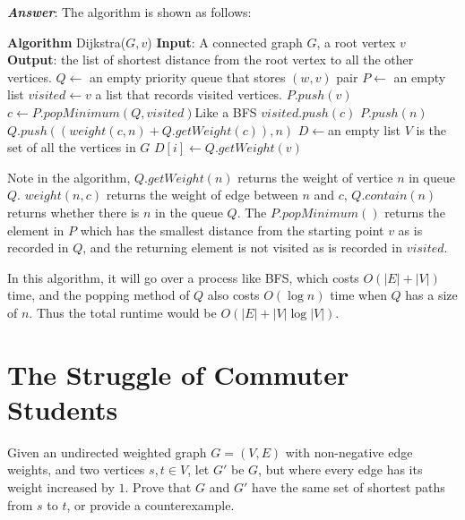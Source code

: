 \documentclass[11pt]{article}
\begin{document}
\noindent \textbf{\emph{Answer}}: The algorithm is shown as follows:
\begin{algorithmic}
	\State \textbf{Algorithm} Dijkstra($G,v$)
	\State \textbf{Input}: A connected graph $G$, a root vertex $v$
	\State \textbf{Output}: the list of shortest distance from the root vertex to all the other vertices.
	\State $Q\gets$ an empty priority queue that stores $(w,v)$ pair
	\State $P\gets$ an empty list
	\State $visited \gets v$ \Comment a list that records visited vertices.
	\State $P.push(v)$
		\State $c\gets P.popMinimum(Q,visited)$\Comment Like a BFS
		\State $visited.push(c)$
			\State $P.push(n)$
				\State $Q.push((weight(c,n)+Q.getWeight(c)),n)$
			\EndIf
		\EndFor
	\EndWhile
	\State $D\gets $an empty list
	\Comment $V$ is the set of all the vertices in $G$
		\State $D[i]\gets Q.getWeight(v)$
	\EndFor
\end{algorithmic}

Note in the algorithm, $Q.getWeight(n)$ returns the weight of vertice $n$ in queue $Q$. $weight(n,c)$ returns the weight of edge between $n$ and $c$, $Q.contain(n)$ returns whether there is $n$ in the queue $Q$. The $P.popMinimum()$ returns the element in $P$ which has the smallest distance from the starting point $v$ as is recorded in $Q$, and the returning element is not visited as is recorded in $visited$.

In this algorithm, it will go over a process like BFS, which costs $O(|E|+|V|)$ time, and the popping method of $Q$ also costs $O(\log n)$ time when $Q$ has a size of $n$. Thus the total runtime would be $O(|E|+|V|\log |V|)$.
\section{The Struggle of Commuter Students}
Given an undirected weighted graph $G=(V,E)$ with non-negative edge weights, and two vertices $s,t\in V$, let $G'$ be $G$, but where every edge has its weight increased by $1$. Prove that $G$ and $G'$ have the same set of shortest paths from $s$ to $t$, or provide a counterexample.
\end{document}
